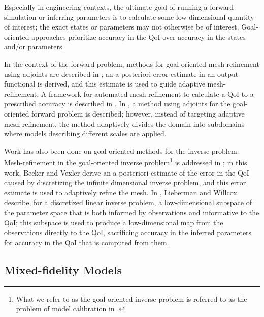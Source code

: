 Especially in engineering contexts, the ultimate goal of running a forward simulation or inferring parameters is to calculate some low-dimensional quantity of interest; the exact states or parameters may not otherwise be of interest. Goal-oriented approaches prioritize accuracy in the QoI over accuracy in the states and/or parameters. 

In the context of the forward problem, methods for goal-oriented mesh-refinement using adjoints are described in \cite{PrudOden99,VendDarm00,BecRann01}; an a posteriori error estimate in an output functional is derived, and this estimate is used to guide adaptive mesh-refinement. A framework for automated mesh-refinement to calculate a QoI to a prescribed accuracy is described in \cite{Yano12}. In \cite{OdenPrudetal06}, a method using adjoints for the goal-oriented forward problem is described; however, instead of targeting adaptive mesh refinement, the method adaptively divides the domain into subdomains where models describing different scales are applied. 

Work has also been done on goal-oriented methods for the inverse problem. Mesh-refinement in the goal-oriented inverse problem\footnote{What we refer to as the goal-oriented inverse problem is referred to as the problem of model calibration in \cite{BecVex05}.} is addressed in \cite{BecVex05}; in this work, Becker and Vexler derive an a posteriori estimate of the error in the QoI caused by discretizing the infinite dimensional inverse problem, and this error estimate is used to adaptively refine the mesh. In \cite{LiebWill13}, Lieberman and Willcox describe, for a discretized linear inverse problem, a low-dimensional subspace of the parameter space that is both informed by observations and informative to the QoI; this subspace is used to produce a low-dimensional map from the observations directly to the QoI, sacrificing accuracy in the inferred parameters for accuracy in the QoI that is computed from them.

\subsection{Mixed-fidelity Models} \label{sec:multFid}

